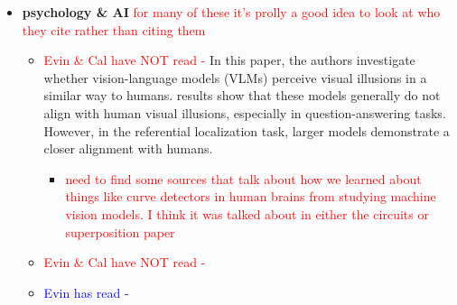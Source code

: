 \documentclass{article}
\begin{document}
\begin{itemize}
    \item \textbf{psychology \& AI} \textcolor{red}{for many of these it's prolly a good idea to look at who they cite rather than citing them}
    \begin{itemize}
        \item \textcolor{red}{Evin \& Cal have NOT read - } \cite{zhang2023grounding} In this paper, the authors investigate whether vision-language models (VLMs) perceive visual illusions in a similar way to humans. results show that these models generally do not align with human visual illusions, especially in question-answering tasks. However, in the referential localization task, larger models demonstrate a closer alignment with humans.
        \begin{itemize}
            \item \textcolor{red}{need to find some sources that talk about how we learned about things like curve detectors in human brains from studying machine vision models. I think it was talked about in either the circuits or superposition paper \cite{olah2020zoom, elhage2022toy}}
        \end{itemize}
        \item \textcolor{red}{Evin \& Cal have NOT read - }
        \item \textcolor{blue}{Evin has read -}
    \end{itemize}


\end{itemize}
\end{document}
